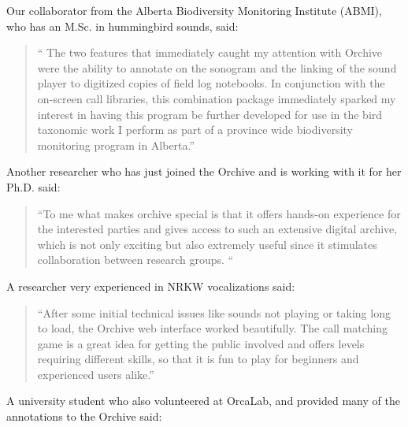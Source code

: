 \documentclass[12pt,oneside]{book}
\begin{document}
Our collaborator from the Alberta Biodiversity Monitoring Institute
(ABMI), who has an M.Sc. in hummingbird sounds, said:

\begin{quote}
`` The two features that immediately caught my attention with Orchive
  were the ability to annotate on the sonogram and the linking of the
  sound player to digitized copies of field log notebooks.  In
  conjunction with the on-screen call libraries, this combination
  package immediately sparked my interest in having this program be
  further developed for use in the bird taxonomic work I perform as
  part of a province wide biodiversity monitoring program in
  Alberta.''
\end{quote}

Another researcher who has just joined the Orchive and is working with
it for her Ph.D. said:

\begin{quote}
	``To me what makes orchive special is that it offers hands-on
  experience for the interested parties and gives access to such an
  extensive digital archive, which is not only exciting but also
  extremely useful since it stimulates collaboration between research
  groups. ``
\end{quote}		

A researcher very experienced in NRKW vocalizations said:

\begin{quote}
``After some initial technical issues like sounds not playing or
taking long to load, the Orchive web interface worked beautifully. The
call matching game is a great idea for getting the public involved and
offers levels requiring different skills, so that it is fun to play
for beginners and experienced users alike.''
\end{quote}

A university student who also volunteered at OrcaLab, and provided
many of the annotations to the Orchive said:
\end{document}
